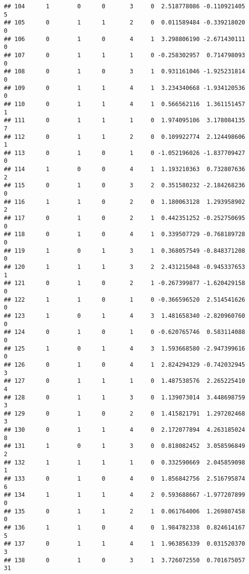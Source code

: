 \documentclass[]{article}
\begin{document}
\begin{verbatim}
## 104      1        0      0       3     0  2.518778086 -0.110921405     5
## 105      0        1      1       2     0  0.011589484 -0.339218020     0
## 106      0        1      0       4     1  3.298806190 -2.671430111     0
## 107      0        1      1       1     0 -0.258302957  0.714798093     0
## 108      0        1      0       3     1  0.931161046 -1.925231814     0
## 109      0        1      1       4     1  3.234340668 -1.934120536     0
## 110      0        1      1       4     1  0.566562116  1.361151457     1
## 111      0        1      1       1     0  1.974095106  3.178084135     7
## 112      0        1      1       2     0  0.109922774  2.124498606     1
## 113      0        1      0       1     0 -1.052196026 -1.837709427     0
## 114      1        0      0       4     1  1.193210363  0.732807636     2
## 115      0        1      0       3     2  0.351580232 -2.184268236     0
## 116      1        1      0       2     0  1.180063128  1.293958902     2
## 117      0        1      0       2     1  0.442351252 -0.252750695     0
## 118      0        1      0       4     1  0.339507729 -0.768189728     0
## 119      1        0      1       3     1  0.368057549 -0.848371208     0
## 120      1        1      1       3     2  2.431215048 -0.945337653     1
## 121      0        1      0       2     1 -0.267399877 -1.620429158     0
## 122      1        1      0       1     0 -0.366596520  2.514541626     0
## 123      1        0      1       4     3  1.481658340 -2.820960760     0
## 124      0        1      0       1     0 -0.620765746  0.583114088     0
## 125      1        0      1       4     3  1.593668580 -2.947399616     0
## 126      0        1      0       4     1  2.824294329 -0.742032945     3
## 127      0        1      1       1     0  1.487538576  2.265225410     4
## 128      0        1      1       3     0  1.139073014  3.448698759     3
## 129      0        1      0       2     0  1.415821791  1.297202468     3
## 130      0        1      1       4     0  2.172077894  4.263185024     8
## 131      1        0      1       3     0  0.818082452  3.058596849     2
## 132      1        1      1       1     0  0.332590669  2.045859098     1
## 133      0        1      0       4     0  1.856842756  2.516795874     6
## 134      1        1      1       4     2  0.593688667 -1.977207899     0
## 135      0        1      1       2     1  0.061764006  1.269807458     0
## 136      1        1      0       4     0  1.984782338  0.824614167     5
## 137      0        1      1       4     1  1.963856339  0.031520370     3
## 138      0        1      0       3     1  3.726072550  0.701675057    31

\end{verbatim}
\end{document}
